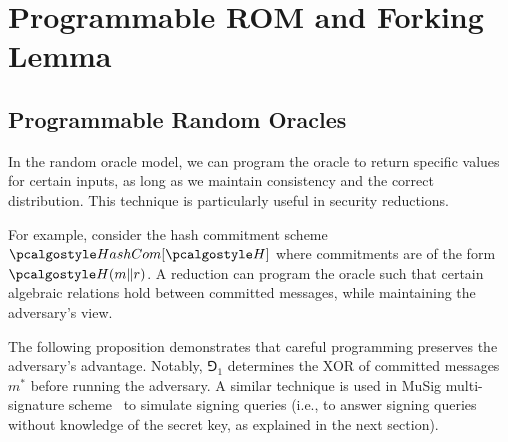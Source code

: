 \section{Programmable ROM and Forking Lemma}\label{sec:prog-rom}

\subsection{Programmable Random Oracles}

In the random oracle model, we can program the oracle to return specific values for certain inputs, as long as we maintain consistency and the correct distribution.
This technique is particularly useful in security reductions.

For example, consider the hash commitment scheme $\algo{HashCom}[\algo{H}]$ where commitments are of the form $\algo{H}(m \| r)$.
A reduction can program the oracle such that certain algebraic relations hold between committed messages, while maintaining the adversary's view.

The following proposition demonstrates that careful programming preserves the adversary's advantage. Notably, $\Game_1$ determines the XOR of committed messages $m^*$ before running the adversary.
A similar technique is used in MuSig multi-signature scheme~\cite{DCC:MPSW19} to simulate signing queries (i.e., to answer signing queries without knowledge of the secret key, as explained in the next section).

